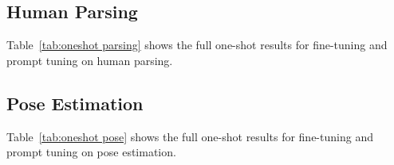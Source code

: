 \documentclass[10pt,twocolumn,letterpaper]{article}
\begin{document}
\subsection{Human Parsing}
Table~\ref{tab:oneshot parsing} shows the full  one-shot results for  fine-tuning and prompt tuning on human parsing. \begin{table}[htbp]
  \centering
  \caption{One-shot human parsing results on ATR, evaluated by pACC. FT - finetuning, PT - prompt tuning.}
\end{table}

\subsection{Pose Estimation}
Table~\ref{tab:oneshot pose} shows the full one-shot results for fine-tuning and prompt tuning on pose estimation. \begin{table}[htbp]
  \centering
  \caption{One-shot pose estimation results on MPII, evaluated by mAP. FT - finetuning, PT - prompt tuning.}
\end{table}
\end{document}
